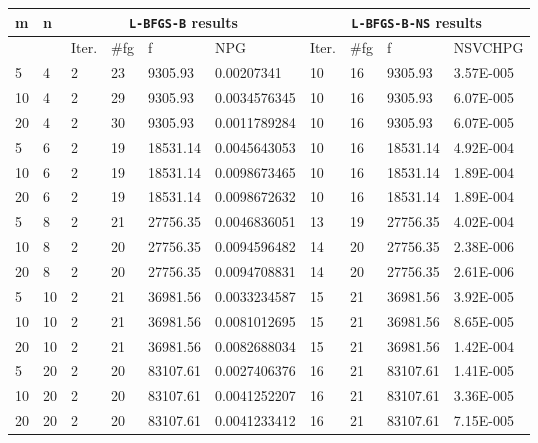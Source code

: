 \begin{center}
  \begin{table}
    \begin{center}
      \scriptsize
      \begin{tabular}{|l|l|l|l|l|l|l|l|l|l|}
        \hline
m  &  n   & \multicolumn{4}{|c|}{\texttt{L-BFGS-B} results} & \multicolumn{4}{|c|}{\texttt{L-BFGS-B-NS} results} \\ \hline
         &  & Iter. & \#fg & f & NPG &  Iter.  & \#fg & f & NSVCHPG \\ \hline
        5 & 4 & 2 & 23 & 9305.93 & 0.00207341 & 10 & 16 & 9305.93 & 3.57E-005\\
        10 & 4 & 2 & 29 & 9305.93 & 0.0034576345 & 10 & 16 & 9305.93 & 6.07E-005\\
        20 & 4 & 2 & 30 & 9305.93 & 0.0011789284 & 10 & 16 & 9305.93 & 6.07E-005\\
        5 & 6 & 2 & 19 & 18531.14 & 0.0045643053 & 10 & 16 & 18531.14 & 4.92E-004\\
        10 & 6 & 2 & 19 & 18531.14 & 0.0098673465 & 10 & 16 & 18531.14 & 1.89E-004\\
        20 & 6 & 2 & 19 & 18531.14 & 0.0098672632 & 10 & 16 & 18531.14 & 1.89E-004\\
        5 & 8 & 2 & 21 & 27756.35 & 0.0046836051 & 13 & 19 & 27756.35 & 4.02E-004\\
        10 & 8 & 2 & 20 & 27756.35 & 0.0094596482 & 14 & 20 & 27756.35 & 2.38E-006\\
        20 & 8 & 2 & 20 & 27756.35 & 0.0094708831 & 14 & 20 & 27756.35 & 2.61E-006\\
        5 & 10 & 2 & 21 & 36981.56 & 0.0033234587 & 15 & 21 & 36981.56 & 3.92E-005\\
        10 & 10 & 2 & 21 & 36981.56 & 0.0081012695 & 15 & 21 & 36981.56 & 8.65E-005\\
        20 & 10 & 2 & 21 & 36981.56 & 0.0082688034 & 15 & 21 & 36981.56 & 1.42E-004\\
        5 & 20 & 2 & 20 & 83107.61 & 0.0027406376 & 16 & 21 & 83107.61 & 1.41E-005\\
        10 & 20 & 2 & 20 & 83107.61 & 0.0041252207 & 16 & 21 & 83107.61 & 3.36E-005\\
        20 & 20 & 2 & 20 & 83107.61 & 0.0041233412 & 16 & 21 & 83107.61 & 7.15E-005\\

\end{tabular}
\end{center}
\end{table}
\end{center}
